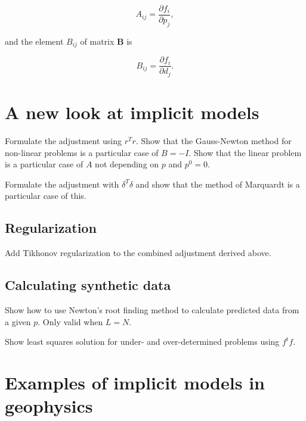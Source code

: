 \documentclass[onecolumn]{article}
\begin{document}
\begin{equation}
    A_{ij} = \dfrac{\partial f_i}{\partial p_j},
    \label{eq:A}
\end{equation}

\noindent
and the element $B_{ij}$ of matrix $\mathbf{B}$ is

\begin{equation}
    B_{ij} = \dfrac{\partial f_i}{\partial d_j}.
    \label{eq:B}
\end{equation}


\section{A new look at implicit models}

Formulate the adjustment using $r^Tr$.
Show that the Gauss-Newton method
for non-linear problems
is a particular case of $B = -I$.
Show that the linear problem
is a particular case of $A$ not depending on $p$
and $p^0 = 0$.

Formulate the adjustment with $\delta^T\delta$
and show that the method of Marquardt
is a particular case of this.



\subsection{Regularization}

Add Tikhonov regularization to the combined adjustment derived above.



\subsection{Calculating synthetic data}

Show how to use Newton's root finding method to calculate predicted data from a
given $p$. Only valid when $L = N$.

Show least squares solution for under- and over-determined problems using
$f^tf$.




\section{Examples of implicit models in geophysics}
\end{document}
